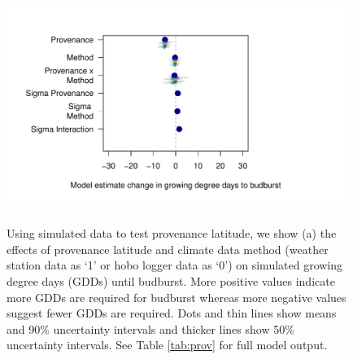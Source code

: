 \documentclass{article}\usepackage[]{graphicx}\usepackage[]{color}
\begin{document}
\begin{figure}[H]
      \centering
      \includegraphics[height=7cm, width=11cm]{..//analyses/figures/muplot_prov.pdf}
      \label{fig:muplotprovsims}
\caption{ Using simulated data to test provenance latitude, we show (a) the effects of provenance latitude and climate data method (weather station data as `1' or hobo logger data as `0') on simulated growing degree days (GDDs) until budburst. More positive values indicate more GDDs are required for budburst whereas more negative values suggest fewer GDDs are required. Dots and thin lines show means and 90\% uncertainty intervals and thicker lines show 50\% uncertainty intervals. See Table \ref{tab:prov} for full model output. }
\label{fig:provsims}
\end{figure}
\end{document}
